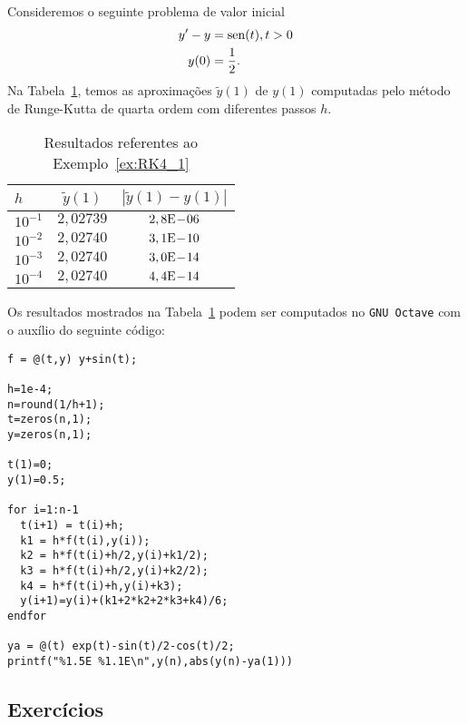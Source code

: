 \begin{ex}\label{ex:RK4_1}
  Consideremos o seguinte problema de valor inicial
  \begin{align}
    y' - y &= \operatorname{sen}(t), t>0\\
    y(0) &= \frac{1}{2}.
  \end{align}
  Na Tabela~\ref{tab:ex_RK4_1}, temos as aproximações $\tilde{y}(1)$ de $y(1)$ computadas pelo método de Runge-Kutta de quarta ordem com diferentes passos $h$.
 
  \begin{table}[h!]
    \centering
    \begin{tabular}{l|cc}
      $h$ & $\tilde{y}(1)$ & $|\tilde{y}(1)-y(1)|$\\\hline
      $10^{-1}$ & $2,02739$ & $2,8\mathrm{E}\!-\!06$ \\
      $10^{-2}$ & $2,02740$ & $3,1\mathrm{E}\!-\!10$ \\
      $10^{-3}$ & $2,02740$ & $3,0\mathrm{E}\!-\!14$ \\
      $10^{-4}$ & $2,02740$ & $4,4\mathrm{E}\!-\!14$ \\\hline
    \end{tabular}
    \caption{Resultados referentes ao Exemplo~\ref{ex:RK4_1}}
    \label{tab:ex_RK4_1}
  \end{table}

\ifisoctave
Os resultados mostrados na Tabela~\ref{tab:ex_RK4_1} podem ser computados no \verb+GNU Octave+ com o auxílio do seguinte código:
\begin{verbatim}
f = @(t,y) y+sin(t);

h=1e-4;
n=round(1/h+1);
t=zeros(n,1);
y=zeros(n,1);

t(1)=0;
y(1)=0.5;

for i=1:n-1
  t(i+1) = t(i)+h;
  k1 = h*f(t(i),y(i));
  k2 = h*f(t(i)+h/2,y(i)+k1/2);
  k3 = h*f(t(i)+h/2,y(i)+k2/2);
  k4 = h*f(t(i)+h,y(i)+k3);
  y(i+1)=y(i)+(k1+2*k2+2*k3+k4)/6;
endfor

ya = @(t) exp(t)-sin(t)/2-cos(t)/2;
printf("%1.5E %1.1E\n",y(n),abs(y(n)-ya(1)))
\end{verbatim}
\fi
\end{ex}

\subsection*{Exercícios}

